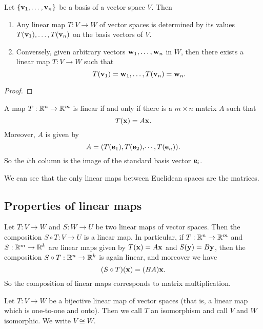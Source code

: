 \documentclass[10pt, a4paper]{article}
\begin{document}
\begin{lemma}
    Let $\{\mathbf{v}_1, \dotsc, \mathbf{v}_n\}$ be a basis of a vector space $V$.
    Then
    \begin{enumerate}[label = (\roman*)]
        \item Any linear map $T : V \rightarrow W$ of vector spaces is determined by its values $T(\mathbf{v}_1), \dotsc, T(\mathbf{v}_n)$ on the basis vectors of $V$.
        \item Conversely,
        given arbitrary vectors $\mathbf{w}_1, \dotsc, \mathbf{w}_n$ in $W$,
        then there exists a linear map $T : V \rightarrow W$ such that
        \[
        T(\mathbf{v}_1) = \mathbf{w}_1, \dotsc, T(\mathbf{v}_n) = \mathbf{w}_n.
        \]
    \end{enumerate}
    \begin{proof}
        
    \end{proof}
\end{lemma}

\begin{lemma}
    A map $T : \mathbb{R} ^ n \rightarrow \mathbb{R} ^ m$ is linear if and only if there is a $m \times n$ matrix $A$ such that
    \[
    T(\mathbf{x}) = A\mathbf{x}.
    \]
    Moreover,
    $A$ is given by
    \[
    A = (T(\mathbf{e}_1), T(\mathbf{e}_2), \dotsi, T(\mathbf{e}_n)).
    \]
    So the $i$th column is the image of the standard basis vector $\mathbf{e}_i$.
\end{lemma}

We can see that the only linear maps between Euclidean spaces are the matrices.

\subsection{Properties of linear maps}
\begin{lemma}
    Let $T : V \rightarrow W$ and $S : W \rightarrow U$ be two linear maps of vector spaces.
    Then the composition $S \circ T : V \rightarrow U$ is a linear map.
    In particular,
    if $T : \mathbb{R} ^ n \rightarrow \mathbb{R} ^ m$ and $S : \mathbb{R} ^ m \rightarrow \mathbb{R} ^ k$ are linear maps given by $T(\mathbf{x}) = A\mathbf{x}$ and $S(\mathbf{y}) = B\mathbf{y}$,
    then the composition $S \circ T : \mathbb{R} ^ n \rightarrow \mathbb{R} ^ k$ is again linear,
    and moreover we have
    \[
    (S \circ T)(\mathbf{x}) = (BA)\mathbf{x}.
    \]
    So the composition of linear maps corresponds to matrix multiplication.
\end{lemma}

\begin{definition}[Isomorphism]
    Let $T : V \rightarrow W$ be a bijective linear map of vector spaces
    (that is,
    a linear map which is one-to-one and onto).
    Then we call $T$ an isomorphism and call $V$ and $W$ isomorphic.
    We write $V \cong W$.
\end{definition}
\end{document}
